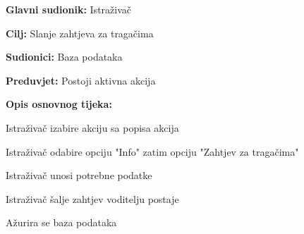 					\noindent {}
					\begin{packed_item}
	
						\item \textbf{Glavni sudionik: } Istraživač
						\item  \textbf{Cilj:} Slanje zahtjeva za tragačima
						\item  \textbf{Sudionici:} Baza podataka
						\item  \textbf{Preduvjet:} Postoji aktivna akcija
						\item  \textbf{Opis osnovnog tijeka:}
						
						\item[] \begin{packed_enum}
	
							\item  Istraživač izabire akciju sa popisa akcija
							\item  Istraživač odabire opciju "Info" zatim opciju "Zahtjev za tragačima"
							\item  Istraživač unosi potrebne podatke
							\item  Istraživač šalje zahtjev voditelju postaje
							\item  Ažurira se baza podataka
						
						\end{packed_enum}
					\end{packed_item}
					\noindent {}
